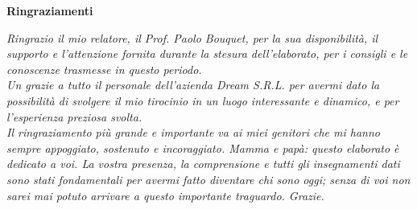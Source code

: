\thispagestyle{empty}

\begin{center}
  {\bf \Huge Ringraziamenti}
\end{center}

\vspace{2cm}

\noindent
\newline
\emph{
Ringrazio il mio relatore, il Prof. Paolo Bouquet, per la sua disponibilità, il supporto e l'attenzione fornita durante la stesura dell'elaborato, per i consigli e le conoscenze trasmesse in questo periodo.\\
\newline
Un grazie a tutto il personale dell'azienda Dream S.R.L. per avermi dato la possibilità di svolgere il mio tirocinio in un luogo interessante e dinamico, e per l’esperienza preziosa svolta.\\
\newline
Il ringraziamento più grande e importante va ai miei genitori che mi hanno sempre appoggiato, sostenuto e incoraggiato. Mamma e papà: questo elaborato è dedicato a voi. La vostra presenza, la comprensione e tutti gli insegnamenti dati sono stati fondamentali per avermi fatto diventare chi sono oggi; senza di voi non sarei mai potuto arrivare a questo importante traguardo. Grazie. \\
}
